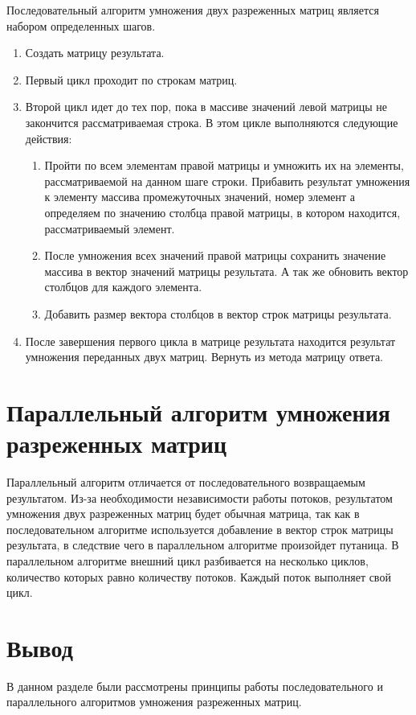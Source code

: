 Последовательный алгоритм умножения двух разреженных матриц является набором определенных шагов.
\begin{enumerate}[label=\arabic*)]
	\item Создать матрицу результата.
	\item Первый цикл проходит по строкам матриц.
	\item Второй цикл идет до тех пор, пока в массиве значений левой матрицы не закончится рассматриваемая строка. В этом цикле выполняются следующие действия:
	\begin{enumerate}
		\item Пройти по всем элементам правой матрицы и умножить их на элементы, рассматриваемой на данном шаге строки. Прибавить результат умножения к элементу массива промежуточных значений, номер элемент а определяем по значению столбца правой матрицы, в котором находится, рассматриваемый элемент.
		\item После умножения всех значений правой матрицы сохранить значение массива в вектор значений матрицы результата. А так же обновить вектор столбцов для каждого элемента.
		\item Добавить размер вектора столбцов в вектор строк матрицы результата.
	\end{enumerate}
	\item После завершения первого цикла в матрице результата находится результат умножения переданных двух матриц. Вернуть из метода матрицу ответа.
\end{enumerate}

\section{Параллельный алгоритм умножения разреженных матриц}

Параллельный алгоритм отличается от последовательного возвращаемым результатом. Из-за необходимости независимости работы потоков, результатом умножения двух разреженных матриц будет обычная матрица, так как в последовательном алгоритме используется добавление в вектор строк матрицы результата, в следствие чего в параллельном алгоритме произойдет путаница.
В параллельном алгоритме внешний цикл разбивается на несколько циклов, количество которых равно количеству потоков. Каждый поток выполняет свой цикл.

\section*{Вывод}

В данном разделе были рассмотрены принципы работы последовательного и параллельного алгоритмов умножения разреженных матриц.